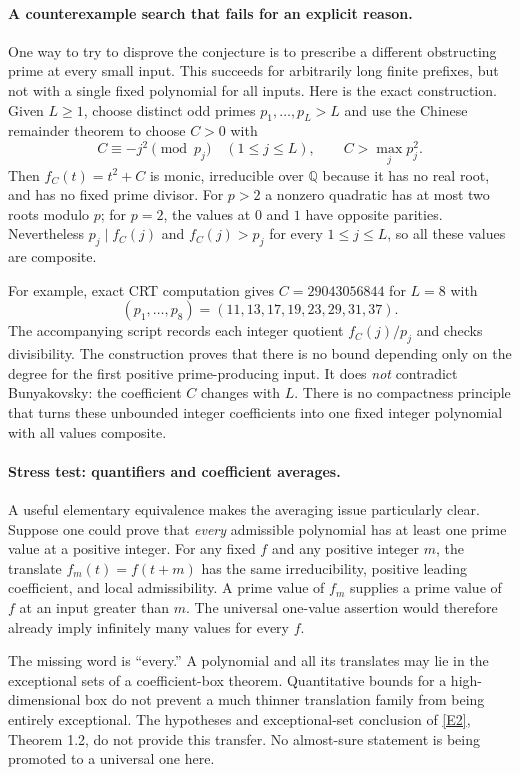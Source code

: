 \documentclass[11pt]{article}
\newcommand{\Q}{\mathbb{Q}}
\newcommand{\eref}[2]{\hyperlink{extra:#1:#2}{[E#2]}}
\begin{document}
\paragraph{A counterexample search that fails for an explicit reason.}
One way to try to disprove the conjecture is to prescribe a different
obstructing prime at every small input. This succeeds for arbitrarily long
finite prefixes, but not with a single fixed polynomial for all inputs.
Here is the exact construction. Given $L\ge1$, choose distinct odd primes
$p_1,\ldots,p_L>L$ and use the Chinese remainder theorem to choose $C>0$
with
\[
 C\equiv-j^2\pmod{p_j}\quad(1\le j\le L),\qquad
 C>\max_j p_j^2.
\]
Then $f_C(t)=t^2+C$ is monic, irreducible over $\Q$ because it has no real
root, and has no fixed prime divisor. For $p>2$ a nonzero quadratic has at
most two roots modulo $p$; for $p=2$, the values at $0$ and $1$ have opposite
parities. Nevertheless $p_j\mid f_C(j)$ and $f_C(j)>p_j$ for every
$1\le j\le L$, so all these values are composite.

For example, exact CRT computation gives $C=29043056844$ for $L=8$ with
\[
 (p_1,\ldots,p_8)=(11,13,17,19,23,29,31,37).
\]
The accompanying script records each integer quotient $f_C(j)/p_j$ and
checks divisibility. The construction proves that there is no bound depending
only on the degree for the first positive prime-producing input. It does
\emph{not} contradict Bunyakovsky: the coefficient $C$ changes with $L$.
There is no compactness principle that turns these unbounded integer
coefficients into one fixed integer polynomial with all values composite.

\paragraph{Stress test: quantifiers and coefficient averages.}
A useful elementary equivalence makes the averaging issue particularly clear.
Suppose one could prove that \emph{every} admissible polynomial has at least
one prime value at a positive integer. For any fixed $f$ and any positive
integer $m$, the translate $f_m(t)=f(t+m)$ has the same irreducibility,
positive leading coefficient, and local admissibility. A prime value of
$f_m$ supplies a prime value of $f$ at an input greater than $m$. The
universal one-value assertion would therefore already imply infinitely many
values for every $f$.

The missing word is ``every.'' A polynomial and all its translates may lie
in the exceptional sets of a coefficient-box theorem. Quantitative bounds
for a high-dimensional box do not prevent a much thinner translation family
from being entirely exceptional. The hypotheses and exceptional-set conclusion
of \eref{statement}{2}, Theorem 1.2, do not provide this transfer. No almost-sure
statement is being promoted to a universal one here.
\end{document}
